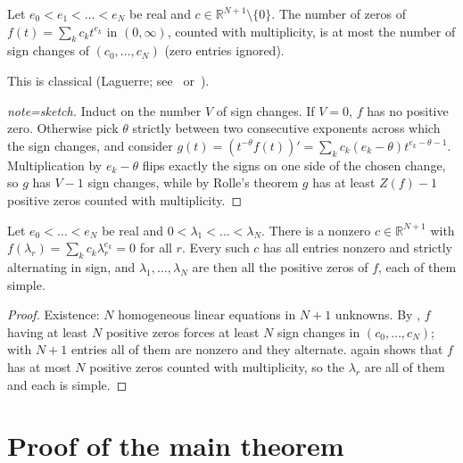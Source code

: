 \documentclass[11pt,a4paper]{report}
\begin{document}
\begin{lemma}[note={Descartes' rule for real exponents}]\label{lem:descartes}
Let \(e_0<e_1<\dots<e_N\) be real and \(c\in\mathbb R^{N+1}\setminus\{0\}\). The number of zeros of
\(f(t)=\sum_kc_kt^{e_k}\) in \((0,\infty)\), counted with multiplicity, is at most the number of sign changes of
\((c_0,\dots,c_N)\) (zero entries ignored).
\end{lemma}

This is classical (Laguerre; see~\autocite[Part~V, Ch.~1]{PolyaSzego} or~\autocite{Jameson2006}).

\begin{proof}[note=sketch]
Induct on the number \(V\) of sign changes. If \(V=0\), \(f\) has no positive zero. Otherwise pick \(\theta\)
strictly between two consecutive exponents across which the sign changes, and consider
\(g(t)=(t^{-\theta}f(t))'=\sum_kc_k(e_k-\theta)t^{e_k-\theta-1}\). Multiplication by \(e_k-\theta\) flips exactly
the signs on one side of the chosen change, so \(g\) has \(V-1\) sign changes, while by Rolle's theorem \(g\) has at
least \(Z(f)-1\) positive zeros counted with multiplicity.
\end{proof}

\begin{lemma}\label{lem:prescribed}
Let \(e_0<\dots<e_N\) be real and \(0<\lambda_1<\dots<\lambda_N\). There is a nonzero \(c\in\mathbb R^{N+1}\) with
\(f(\lambda_r)=\sum_kc_k\lambda_r^{e_k}=0\) for all \(r\). Every such \(c\) has all entries nonzero and strictly
alternating in sign, and \(\lambda_1,\dots,\lambda_N\) are then all the positive zeros of \(f\), each of them
simple.
\end{lemma}

\begin{proof}
Existence: \(N\) homogeneous linear equations in \(N+1\) unknowns. By , \(f\) having at least
\(N\) positive zeros forces at least \(N\) sign changes in \((c_0,\dots,c_N)\); with \(N+1\) entries all of them are
nonzero and they alternate.  again shows that \(f\) has at most \(N\) positive zeros counted
with multiplicity, so the \(\lambda_r\) are all of them and each is simple.
\end{proof}

\section{Proof of the main theorem}
\end{document}
